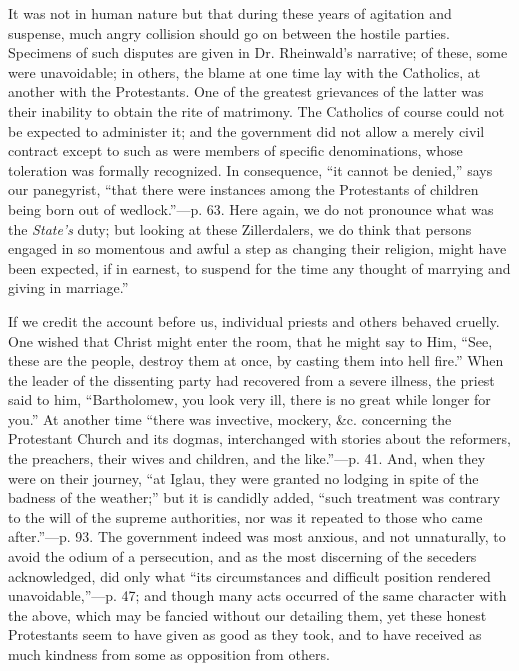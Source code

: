It was not in human nature but that during these
years of agitation and suspense, much angry collision should go on
between the hostile parties. Specimens of such disputes are given in Dr.
Rheinwald's narrative; of these, some were unavoidable; in others, the
blame at one time lay with the Catholics, at another with the
Protestants. One of the greatest grievances of the latter was their
inability to obtain the rite of matrimony. The Catholics of course could
not be expected to administer it; and the government did not allow a
merely civil contract except to such as were members of specific
denominations, whose toleration was formally recognized. In consequence,
``it cannot be denied,'' says our panegyrist, ``that there were instances
among the Protestants of children being born out of wedlock.''—p. 63.
Here again, we do not pronounce what was the \emph{State's} duty; but
looking at these Zillerdalers, we do think that persons engaged in so
momentous and awful a step as changing their religion, might have
been expected, if in earnest, to suspend for the time any thought of
marrying and giving in marriage.''

If we credit the account before us, individual
priests and others behaved cruelly. One wished that Christ might enter
the room, that he might say to Him, ``See, these are the people, destroy
them at once, by casting them into hell fire.'' When the leader of the
dissenting party had recovered from a severe illness, the priest said to
him, ``Bartholomew, you look very ill, there is no great while longer for
you.'' At another time ``there was invective, mockery, \&c. concerning
the Protestant Church and its dogmas, interchanged with stories about
the reformers, the preachers, their wives and children, and the like.''—p.
41. And, when they were on their journey, ``at Iglau, they were granted
no lodging in spite of the badness of the weather;'' but it is candidly
added, ``such treatment was contrary to the will of the supreme
authorities, nor was it repeated to those who came after.''—p. 93. The
government indeed was most anxious, and not unnaturally, to avoid the
odium of a persecution, and as the most discerning of the seceders
acknowledged, did only what ``its circumstances and difficult position
rendered unavoidable,''—p. 47; and though many acts occurred of the
same character with the above, which may be fancied without our
detailing them, yet these honest Protestants seem to have given as good
as they took, and to have received as much kindness from some as
opposition from others.


